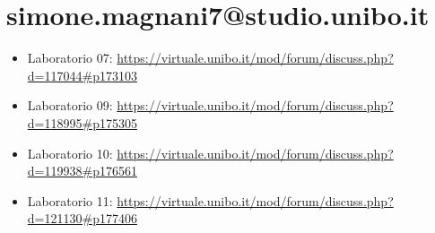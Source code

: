 \section{simone.magnani7@studio.unibo.it}

\begin{itemize}
 \item Laboratorio 07: \url{https://virtuale.unibo.it/mod/forum/discuss.php?d=117044#p173103}
 \item Laboratorio 09: \url{https://virtuale.unibo.it/mod/forum/discuss.php?d=118995#p175305}
 \item Laboratorio 10: \url{https://virtuale.unibo.it/mod/forum/discuss.php?d=119938#p176561}
 \item Laboratorio 11: \url{https://virtuale.unibo.it/mod/forum/discuss.php?d=121130#p177406}
\end{itemize}
